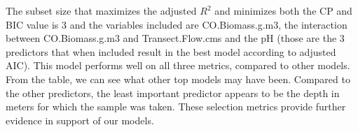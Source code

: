 \vspace{5mm}

The subset size that maximizes the adjusted $R^{2}$ and minimizes both the CP and BIC value is 3 and the variables included are CO.Biomass.g.m3, the interaction between CO.Biomass.g.m3 and Transect.Flow.cms and the pH (those are the 3 predictors that when included result in the best model according to adjusted AIC). This model performs well on all three metrics, compared to other models. From the table, we can see what other top models may have been. Compared to the other predictors, the least important predictor appears to be the depth in meters for which the sample was taken. These selection metrics provide further evidence in support of our models.



